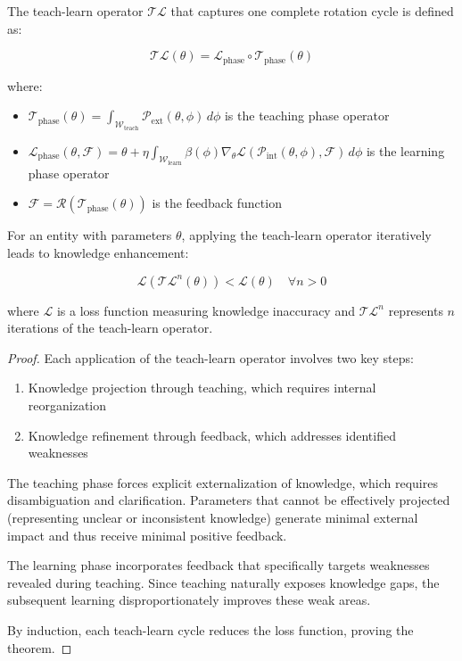 \begin{definition}
The teach-learn operator $\mathcal{TL}$ that captures one complete rotation cycle is defined as:

\begin{equation}
\mathcal{TL}(\theta) = \mathcal{L}_{\text{phase}} \circ \mathcal{T}_{\text{phase}}(\theta)
\end{equation}

where:
\begin{itemize}
    \item $\mathcal{T}_{\text{phase}}(\theta) = \int_{\mathcal{W}_{\text{teach}}} \mathcal{P}_{\text{ext}}(\theta, \phi) \, d\phi$ is the teaching phase operator
    \item $\mathcal{L}_{\text{phase}}(\theta, \mathcal{F}) = \theta + \eta \int_{\mathcal{W}_{\text{learn}}} \beta(\phi) \nabla_{\theta} \mathcal{L}(\mathcal{P}_{\text{int}}(\theta, \phi), \mathcal{F}) \, d\phi$ is the learning phase operator
    \item $\mathcal{F} = \mathcal{R}(\mathcal{T}_{\text{phase}}(\theta))$ is the feedback function
\end{itemize}
\end{definition}

\begin{theorem}
For an entity with parameters $\theta$, applying the teach-learn operator iteratively leads to knowledge enhancement:

\begin{equation}
\mathcal{L}(\mathcal{TL}^n(\theta)) < \mathcal{L}(\theta) \quad \forall n > 0
\end{equation}

where $\mathcal{L}$ is a loss function measuring knowledge inaccuracy and $\mathcal{TL}^n$ represents $n$ iterations of the teach-learn operator.
\end{theorem}

\begin{proof}
Each application of the teach-learn operator involves two key steps:
\begin{enumerate}
    \item Knowledge projection through teaching, which requires internal reorganization
    \item Knowledge refinement through feedback, which addresses identified weaknesses
\end{enumerate}

The teaching phase forces explicit externalization of knowledge, which requires disambiguation and clarification. Parameters that cannot be effectively projected (representing unclear or inconsistent knowledge) generate minimal external impact and thus receive minimal positive feedback.

The learning phase incorporates feedback that specifically targets weaknesses revealed during teaching. Since teaching naturally exposes knowledge gaps, the subsequent learning disproportionately improves these weak areas.

By induction, each teach-learn cycle reduces the loss function, proving the theorem.
\end{proof}

